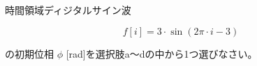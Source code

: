 時間領域ディジタルサイン波 

\[
f[i] = 3 \cdot \sin \left ( 2 \pi \cdot i - 3 \right )
\]

\noindent の初期位相 $\phi$ [rad]を選択肢a〜dの中から1つ選びなさい。
